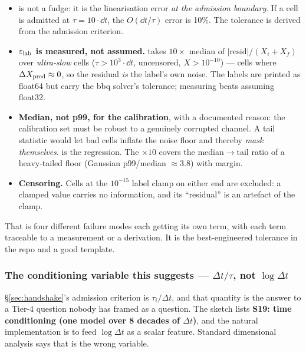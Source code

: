 \begin{itemize}
\item \textbf{} is not a fudge: it is the linearisation
  error \emph{at the admission boundary}. If a cell is admitted at
  $\tau = 10\cdot \dd t$, the $O(\dd t/\tau)$ error is 10\%. The tolerance is
  derived from the admission criterion.
\item \textbf{$\varepsilon_{\rm lab}$ is measured, not assumed.}
   takes $10 \times$ median of
  $|\mathrm{resid}|/(X_i + X_f)$ over \emph{ultra-slow} cells
  ($\tau > 10^{3}\cdot \dd t$, uncensored, $X > 10^{-10}$) --- cells where
  $\Delta X_{\rm pred} \approx 0$, so the residual \emph{is} the label's own
  noise. The labels are printed as float64 but carry the bbq solver's tolerance;
  measuring beats assuming float32.
\item \textbf{Median, not p99, for the calibration}, with a documented reason:
  the calibration set must be robust to a genuinely corrupted channel. A tail
  statistic would let bad cells inflate the noise floor and thereby \emph{mask
  themselves}.
   is
  the regression. The $\times10$ covers the median$\to$tail ratio of a
  heavy-tailed floor (Gaussian p99/median $\approx 3.8$) with margin.
\item \textbf{Censoring.} Cells at the $10^{-15}$ label clamp on either end are
  excluded: a clamped value carries no information, and its ``residual'' is an
  artefact of the clamp.
\end{itemize}

That is four different failure modes each getting its own term, with each term
traceable to a measurement or a derivation. It is the best-engineered tolerance
in the repo and a good template.

\subsubsection{The conditioning variable this suggests ---
               \texorpdfstring{$\Delta t/\tau$}{dt/tau}, not
               \texorpdfstring{$\log \Delta t$}{log dt}}
\label{sec:dttau}

\S\ref{sec:handshake}'s admission criterion is $\tau_i/\Delta t$, and that
quantity is the answer to a Tier-4 question nobody has framed as a question. The
sketch lists \textbf{S19: time conditioning (one model over 8 decades of
$\Delta t$)}, and the natural implementation is to feed $\log\Delta t$ as a
scalar feature. Standard dimensional analysis says that is the wrong variable.

